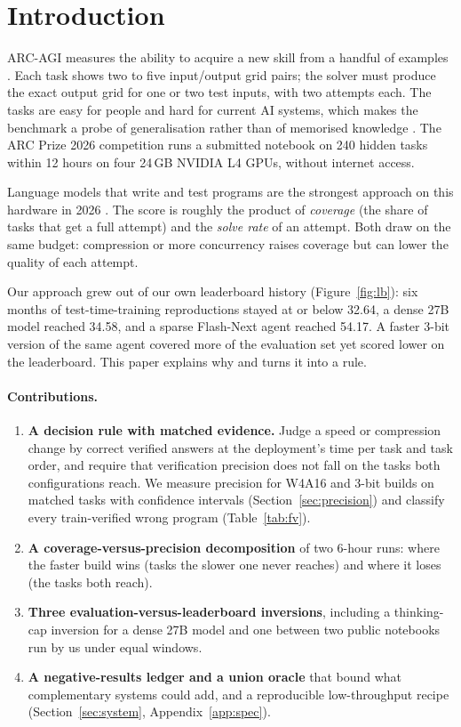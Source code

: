 \documentclass[11pt]{article}
\begin{document}
\section{Introduction}
ARC-AGI measures the ability to acquire a new skill from a handful of examples \cite{chollet2019,arcagi2}. Each task shows two to five input/output grid pairs; the solver must produce the exact output grid for one or two test inputs, with two attempts each. The tasks are easy for people and hard for current AI systems, which makes the benchmark a probe of generalisation rather than of memorised knowledge \cite{arctr2025}.
The ARC Prize 2026 competition runs a submitted notebook on 240 hidden tasks within 12 hours on four 24\,GB NVIDIA L4 GPUs, without internet access.

Language models that write and test programs are the strongest approach on this hardware in 2026 \cite{greenblatt2024,pivotools2026,notnitsuj2026}. The score is roughly the product of \emph{coverage} (the share of tasks that get a full attempt) and the \emph{solve rate} of an attempt. Both draw on the same budget: compression or more concurrency raises coverage but can lower the quality of each attempt.

Our approach grew out of our own leaderboard history (Figure~\ref{fig:lb}): six months of test-time-training reproductions stayed at or below 32.64, a dense 27B model reached 34.58, and a sparse Flash-Next agent reached 54.17. A faster 3-bit version of the same agent covered more of the evaluation set yet scored lower on the leaderboard. This paper explains why and turns it into a rule.

\paragraph{Contributions.}
\begin{enumerate}
\item \textbf{A decision rule with matched evidence.} Judge a speed or compression change by correct verified answers at the deployment's time per task and task order, and require that verification precision does not fall on the tasks both configurations reach. We measure precision for W4A16 and 3-bit builds on matched tasks with confidence intervals (Section~\ref{sec:precision}) and classify every train-verified wrong program (Table~\ref{tab:fv}).
\item \textbf{A coverage-versus-precision decomposition} of two 6-hour runs: where the faster build wins (tasks the slower one never reaches) and where it loses (the tasks both reach).
\item \textbf{Three evaluation-versus-leaderboard inversions}, including a thinking-cap inversion for a dense 27B model and one between two public notebooks run by us under equal windows.
\item \textbf{A negative-results ledger and a union oracle} that bound what complementary systems could add, and a reproducible low-throughput recipe (Section~\ref{sec:system}, Appendix~\ref{app:spec}).
\end{enumerate}
\end{document}
